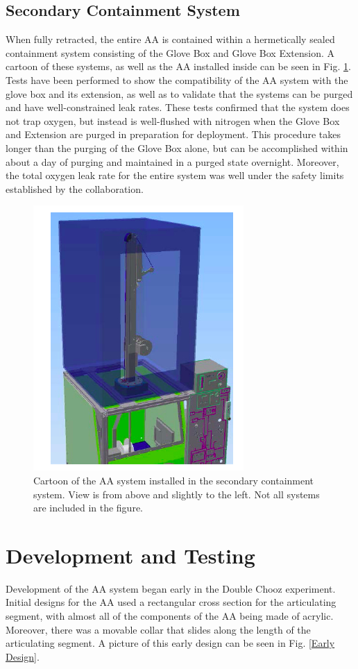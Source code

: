 	\subsection{Secondary Containment System}
	 When fully retracted, the entire AA is contained within a hermetically sealed containment system consisting of the Glove Box and Glove Box Extension. A cartoon of these systems, as well as the AA installed inside can be seen in Fig. \ref{GBE}. Tests have been performed to show the compatibility of the AA system with the glove box and its extension, as well as to validate that the systems can be purged and have well-constrained leak rates. These tests confirmed that the system does not trap oxygen, but instead is well-flushed with nitrogen when the Glove Box and Extension are purged in preparation for deployment. This procedure takes longer than the purging of the Glove Box alone, but can be accomplished within about a day of purging and maintained in a purged state overnight. Moreover, the total oxygen leak rate for the entire system was well under the safety limits established by the collaboration. 

\begin{figure}
\includegraphics[width = .5 \textwidth]{AA/GBE.jpg}
\caption{Cartoon of the AA system installed in the secondary containment system. View is from above and slightly to the left. Not all systems are included in the figure.}
\label{GBE}
\end{figure}

\section{Development and Testing}
Development of the AA system began early in the Double Chooz experiment. Initial designs for the AA used a rectangular cross section for the articulating segment, with almost all of the components of the AA being made of acrylic. Moreover, there was a movable collar that slides along the length of the articulating segment. A picture of this early design can be seen in Fig. \ref{Early Design}.

